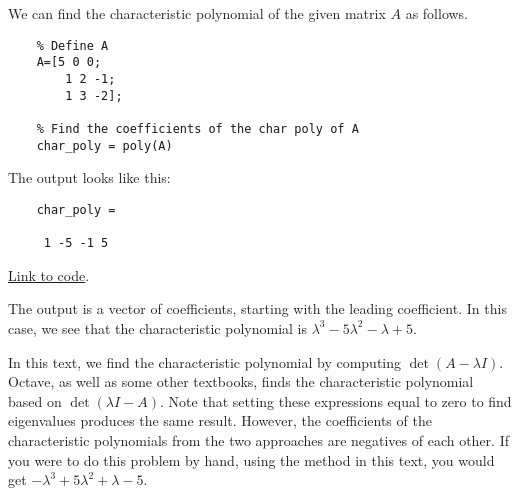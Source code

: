 \documentclass{ximera}
\begin{document}
    \begin{template}\label{temp:charPoly}
        We can find the characteristic polynomial of the given matrix $A$ as follows.
    
        \begin{verbatim}
    % Define A
    A=[5 0 0; 
        1 2 -1; 
        1 3 -2];
    
    % Find the coefficients of the char poly of A
    char_poly = poly(A)
        \end{verbatim}
    
    The output looks like this:
    
    \begin{verbatim}
    char_poly =
    
     1 -5 -1 5
    \end{verbatim}
    
    \href{https://sagecell.sagemath.org/?z=eJxTVXBJTcvMS1Vw5OVytI02VTBQMLBW4OVSAAJDBSMFXUMEz1hB1yjWmpeLl0tVwS0zL0WhJCNVITk_NS0tMzkzNa-kWCE_DSKWkVikUJCfUwkSABoM4seD-bZgYQ1HTQCF1h-X&lang=octave&interacts=eJyLjgUAARUAuQ==}{Link to code}.
    
    The output is a vector of coefficients, starting with the leading coefficient.  In this case, we see that the characteristic polynomial is $\lambda^3-5\lambda^2-\lambda+5$.
    
    \begin{warning}
        In this text, we find the characteristic polynomial by computing $\det{\left(A-\lambda I\right)}$.  Octave, as well as some other textbooks, finds the characteristic polynomial based on $\det{\left(\lambda I-A\right)}$.  Note that setting these expressions equal to zero to find eigenvalues produces the same result. However, the coefficients of the characteristic polynomials from the two approaches are negatives of each other.  If you were to do this problem by hand, using the method in this text, you would get $-\lambda^3+5\lambda^2+\lambda-5$.
    \end{warning}
    \end{template}
\end{document}
